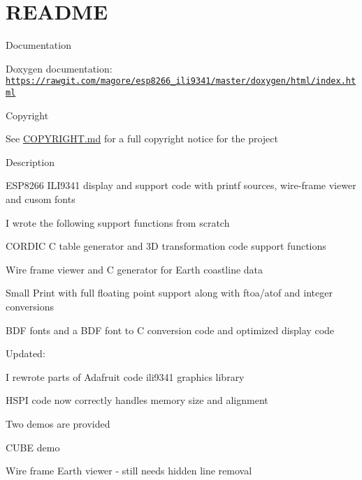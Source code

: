 \hypertarget{index_README}{}\section{R\-E\-A\-D\-M\-E}\label{index_README}
\begin{DoxyParagraph}{Documentation}

\begin{DoxyItemize}
\item Doxygen documentation\-: \href{https://rawgit.com/magore/esp8266_ili9341/master/doxygen/html/index.html}{\tt https\-://rawgit.\-com/magore/esp8266\-\_\-ili9341/master/doxygen/html/index.\-html}
\end{DoxyItemize}
\end{DoxyParagraph}
\begin{DoxyParagraph}{Copyright}

\begin{DoxyItemize}
\item See \hyperlink{md_COPYRIGHT}{C\-O\-P\-Y\-R\-I\-G\-H\-T.md} for a full copyright notice for the project
\end{DoxyItemize}
\end{DoxyParagraph}
\begin{DoxyParagraph}{Description}

\begin{DoxyItemize}
\item E\-S\-P8266 I\-L\-I9341 display and support code with printf sources, wire-\/frame viewer and cusom fonts
\item I wrote the following support functions from scratch
\begin{DoxyItemize}
\item C\-O\-R\-D\-I\-C C table generator and 3\-D transformation code support functions
\item Wire frame viewer and C generator for Earth coastline data
\item Small Print with full floating point support along with ftoa/atof and integer conversions
\item B\-D\-F fonts and a B\-D\-F font to C conversion code and optimized display code
\end{DoxyItemize}
\item Updated\-:
\begin{DoxyItemize}
\item I rewrote parts of Adafruit code ili9341 graphics library
\item H\-S\-P\-I code now correctly handles memory size and alignment
\end{DoxyItemize}
\item Two demos are provided
\begin{DoxyItemize}
\item C\-U\-B\-E demo
\item Wire frame Earth viewer -\/ still needs hidden line removal 


\end{DoxyItemize}
\end{DoxyItemize}
\end{DoxyParagraph}
